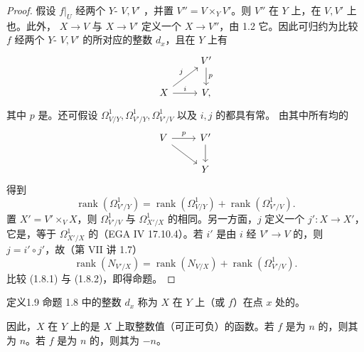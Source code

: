 \begin{proof}
假设 $f|_U$ 经两个 $Y$- $V,V'$ ，并置 $V''=V\times_YV'$。则 $V''$ 在 $Y$ 上，在 $V,V'$ 上也。此外， $X\to V$ 与 $X\to V'$ 定义一个 $X\to V''$，由 1.2 它。因此可归约为比较 $f$ 经两个 $Y$- $V,V'$ 的所对应的整数 $d_x$，且在 $Y$ 上有
\[
\begin{tikzcd}&V'\arrow[d,"p"]\\X\arrow[ur,"j"]\arrow[r,"i"]&V,\end{tikzcd}
\]
其中 $p$ 是。还可假设 $\Omega^1_{V/Y},\Omega^1_{V'/Y},\Omega^1_{V'/V}$ 以及 $i,j$ 的都具有常。
由其中所有均的
\[
\begin{tikzcd}V\arrow[r,"p"]\arrow[dr]&V'\arrow[d]\\&Y\end{tikzcd}
\]
得到
\[\operatorname{rank}(\Omega^1_{V'/Y})=\operatorname{rank}(\Omega^1_{V/Y})+\operatorname{rank}(\Omega^1_{V'/V}).\tag{1.8.1}\]
置 $X'=V'\times_VX$，则 $\Omega^1_{V'/V}$ 与 $\Omega^1_{X'/X}$ 的相同。另一方面，$j$ 定义一个 $j':X\to X'$，它是，等于 $\Omega^1_{X'/X}$ 的（EGA IV 17.10.4）。若 $i'$ 是由 $i$ 经 $V'\to V$ 的，则 $j=i'\circ j'$，故（第 VII 讲 1.7）
\[\operatorname{rank}(N_{V'/X})=\operatorname{rank}(N_{V/X})+\operatorname{rank}(\Omega^1_{V'/V}).\tag{1.8.2}\]
比较 (1.8.1) 与 (1.8.2)，即得命题。
\end{proof}
\begin{SGAresult}{定义}{1.9}
命题 1.8 中的整数 $d_x$ 称为 $X$ 在 $Y$ 上（或 $f$）在点 $x$ 处的。
\end{SGAresult}
因此，$X$ 在 $Y$ 上的是 $X$ 上取整数值（可正可负）的函数。若 $f$ 是为 $n$ 的，则其为 $n$。若 $f$ 是为 $n$ 的，则其为 $-n$。
